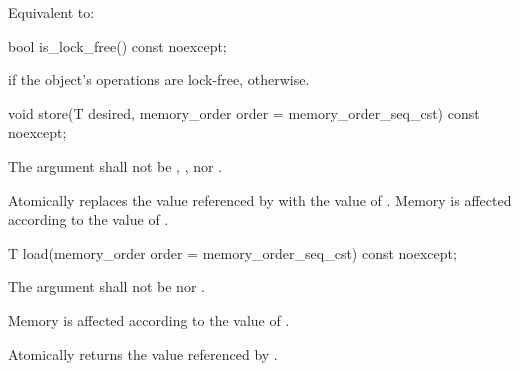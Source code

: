 \begin{itemdescr}
\pnum
\effects Equivalent to: 
\end{itemdescr}

%
%
%
%
\begin{itemdecl}
bool is_lock_free() const noexcept;
\end{itemdecl}

\begin{itemdescr}
\pnum
\returns {} if the object's operations are lock-free,
 otherwise.
\end{itemdescr}

%
%
%
%
\begin{itemdecl}
void store(T desired, memory_order order = memory_order_seq_cst) const noexcept;
\end{itemdecl}

\begin{itemdescr}
\pnum
\requires The  argument shall not be
,
, nor
.

\pnum
\effects Atomically replaces the value referenced by 
with the value of .
Memory is affected according to the value of .
\end{itemdescr}

%
%
%
%
\begin{itemdecl}
T load(memory_order order = memory_order_seq_cst) const noexcept;
\end{itemdecl}

\begin{itemdescr}
\pnum
\requires The  argument shall not be
 nor .

\pnum
\effects Memory is affected according to the value of .

\pnum
\returns Atomically returns the value referenced by .
\end{itemdescr}

